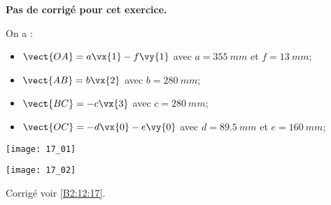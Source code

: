 \normalfalse \difficilefalse \tdifficiletrue
\correctionfalse


\setcounter{numques}{0}


\ifcorrection
\else
\textbf{Pas de corrigé pour cet exercice.}
\fi

\ifprof
\else
On a : 
\begin{itemize}
\item $\vect{OA} = a \vx{1}-f \vy{1}$ avec $a=\SI{355}{mm}$ et $f=\SI{13}{mm}$;
\item $\vect{AB} = b \vx{2}$ avec $b=\SI{280}{mm}$;
\item $\vect{BC} = -c \vx{3}$ avec $c=\SI{280}{mm}$;
\item $\vect{OC} = -d \vx{0}-e\vy{0}$ avec $d=\SI{89,5}{mm}$ et $e=\SI{160}{mm}$;
\end{itemize}

\begin{center}
\texttt{[image: 17\_01]}

\texttt{[image: 17\_02]}
\end{center}
\fi


\ifprof
\else
\fi

\ifprof
\else
\fi


\ifprof
\else
\fi



\ifprof
\else
\begin{flushright}
\footnotesize{Corrigé  voir \ref{B2:12:17}.}
\end{flushright}%
\fi